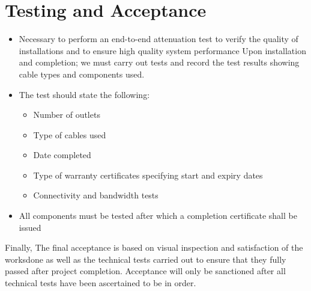 \documentclass[12pt]{article}
\begin{document}
\section{Testing and Acceptance}
\begin{itemize}
    \item Necessary to perform an end-to-end attenuation test to verify the quality of installations and to ensure high quality system performance
    Upon installation and completion; we must carry out tests and record the test results showing cable types and components used.
    \item The test should state the following:
    \begin{itemize}
        \item Number of outlets 
        \item Type of cables used 
        \item Date completed 
        \item Type of warranty certificates specifying start and expiry dates 
        \item Connectivity and bandwidth tests 
    \end{itemize} 
    \item All components must be tested after which a completion certificate shall be issued
\end{itemize}
Finally, The final acceptance is based on visual inspection and satisfaction of the worksdone as well as the technical tests carried out to ensure that they fully passed after project completion. Acceptance will only be sanctioned after all technical tests have been ascertained to be in order.
\end{document}
